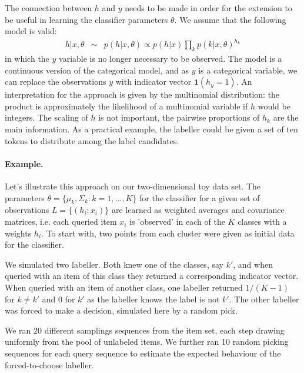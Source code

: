 \documentclass[10pt, onecolumn]{article}
\begin{document}
The connection between $h$ and $y$ needs to be made in order for the
extension to be useful in learning the classifier parameters
$\theta$. We assume that the following model is valid: 
\begin{eqnarray}
\label{eq:ph}
h|x,\theta &\sim & p(h|x, \theta)\propto p(h|x) \prod_k p(k|x, \theta)^{h_k}
\end{eqnarray}
in which the $y$ variable is no longer necessary to be observed. The
model is a continuous version of the categorical model, and as $y$ is a
categorical variable, we can replace the observations $y$ with
indicator vector $\mathbf{1}(h_y=1)$. An interpretation for the
approach is given by the multinomial distribution: the product is
approximately the likelihood of a multinomial variable if $h$ would be
integers. The scaling of $h$ is not important, the pairwise
proportions of $h_k$ are the main information. As a practical example,
the labeller could be given a set of ten tokens to distribute among the
label candidates.


\paragraph{Example.} Let's illustrate this approach on our two-dimensional toy data set. The parameters $\theta=\{\mu_k, \Sigma_k: k=1,...,K\}$ for the classifier for a given set of observations $L=\{(h_i;x_i)\}$ are learned as weighted averages and covariance matrices, i.e. each queried item $x_i$ is 'observed' in each of the
$K$ classes with a weights $h_i$. To start with, two points from each cluster were
given as initial data for the classifier.

We simulated two labeller. Both knew one of the classes, say $k'$, and
when queried with an item of this class they returned a corresponding
indicator vector. When queried with an item of another class, one
labeller returned $1/(K-1)$ for $k\neq k'$ and 0 for $k'$ as the labeller
knows the label is not $k'$. The other labeller was forced to make a
decision, simulated here by a random pick.
 
We ran 20 different samplings sequences from the item set, each step
drawing uniformly from the pool of unlabeled items.  We further ran 10 random picking sequences for each query sequence to estimate the expected behaviour of the forced-to-choose labeller. 
\end{document}

